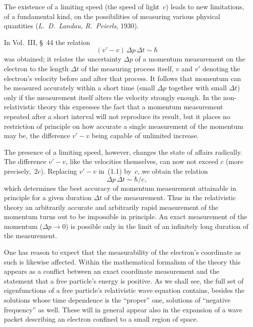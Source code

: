 The existence of a limiting speed (the speed of light~$c$) leads to new limitations, of a fundamental kind, on the possibilities of measuring various physical quantities (\emph{L.~D.~Landau, R.~Peierls}, 1930).

In Vol.~III, \S~44 the relation
\begin{equation}
(v' - v)\,\Delta p\,\Delta t \sim \hbar
\tag{1.1}
\end{equation}
was obtained; it relates the uncertainty $\Delta p$ of a momentum measurement on the electron to the length $\Delta t$ of the measuring process itself, $v$ and $v'$ denoting the electron's velocity before and after that process. It follows that momentum can be measured accurately within a short time (small $\Delta p$ together with small $\Delta t$) only if the measurement itself alters the velocity strongly enough. In the non-relativistic theory this expresses the fact that a momentum measurement repeated after a short interval will not reproduce its result, but it places no restriction of principle on how accurate a single measurement of the momentum may be, the difference $v' - v$ being capable of unlimited increase.

The presence of a limiting speed, however, changes the state of affairs radically. The difference $v' - v$, like the velocities themselves, can now not exceed $c$ (more precisely,~$2c$). Replacing $v' - v$ in~(1.1) by~$c$, we obtain the relation
\begin{equation}
\Delta p\,\Delta t \sim \hbar/c,
\tag{1.2}
\end{equation}
which determines the best accuracy of momentum measurement attainable in principle for a given duration $\Delta t$ of the measurement. Thus in the relativistic theory an arbitrarily accurate and arbitrarily rapid measurement of the momentum turns out to be impossible in principle. An exact measurement of the momentum ($\Delta p \to 0$) is possible only in the limit of an infinitely long duration of the measurement.

One has reason to expect that the measurability of the electron's coordinate as such is likewise affected. Within the mathematical formalism of the theory this appears as a conflict between an exact coordinate measurement and the statement that a free particle's energy is positive. As we shall see, the full set of eigenfunctions of a free particle's relativistic wave equation contains, besides the solutions whose time dependence is the ``proper'' one, solutions of ``negative frequency'' as well. These will in general appear also in the expansion of a wave packet describing an electron confined to a small region of space.

